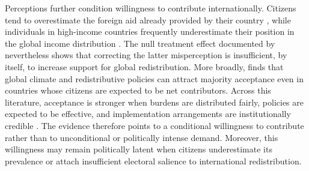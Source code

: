 Perceptions further condition willingness to contribute internationally. Citizens tend to overestimate the foreign aid already provided by their country \citep{kaufmann_foreign_2019}, while individuals in high-income countries frequently underestimate their position in the global income distribution \citep{nair_misperceptions_2018,fehr_your_2019}. The null treatment effect documented by \citet{fehr_your_2019} nevertheless shows that correcting the latter misperception is insufficient, by itself, to increase support for global redistribution. More broadly, \citet{fabre_public_2026} finds that global climate and redistributive policies can attract majority acceptance even in countries whose citizens are expected to be net contributors. Across this literature, acceptance is stronger when burdens are distributed fairly, policies are expected to be effective, and implementation arrangements are institutionally credible \citep{fabre_public_2026,bechtel_mass_2013,gampfer_obtaining_2014}. The evidence therefore points to a conditional willingness to contribute rather than to unconditional or politically intense demand. Moreover, this willingness may remain politically latent when citizens underestimate its prevalence or attach insufficient electoral salience to international redistribution.

